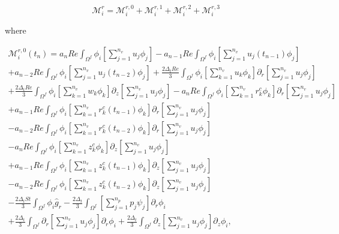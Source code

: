 \documentclass{article}
\begin{document}
\begin{equation}
\mathcal{M}_i^r = \mathcal{M}_i^{r,0} + \mathcal{M}_i^{r,1} + \mathcal{M}_i^{r,2} + \mathcal{M}_i^{r,3} \tag{4.81}
\end{equation}

where

\begin{equation}
\begin{array}{l} \mathcal{M}_i^{r,0}(t_n) = a_n Re \int_{\Omega^f} \phi_i \left[ \sum_{j=1}^{n_v} u_j \phi_j \right] - a_{n-1} Re \int_{\Omega^f} \phi_i \left[ \sum_{j=1}^{n_v} u_j(t_{n-1}) \phi_j \right] \\ + a_{n-2} Re \int_{\Omega^f} \phi_i \left[ \sum_{j=1}^{n_v} u_j(t_{n-2}) \phi_j \right] + \frac{2\Delta_t Re}{3} \int_{\Omega^f} \phi_i \left[ \sum_{k=1}^{n_v} u_k \phi_k \right] \partial_r \left[ \sum_{j=1}^{n_v} u_j \phi_j \right] \\ + \frac{2\Delta_t Re}{3} \int_{\Omega^f} \phi_i \left[ \sum_{k=1}^{n_v} w_k \phi_k \right] \partial_z \left[ \sum_{j=1}^{n_v} u_j \phi_j \right] - a_n Re \int_{\Omega^f} \phi_i \left[ \sum_{k=1}^{n_v} r_k^c \phi_k \right] \partial_r \left[ \sum_{j=1}^{n_v} u_j \phi_j \right] \\ + a_{n-1} Re \int_{\Omega^f} \phi_i \left[ \sum_{k=1}^{n_v} r_k^c(t_{n-1}) \phi_k \right] \partial_r \left[ \sum_{j=1}^{n_v} u_j \phi_j \right] \\ - a_{n-2} Re \int_{\Omega^f} \phi_i \left[ \sum_{k=1}^{n_v} r_k^c(t_{n-2}) \phi_k \right] \partial_r \left[ \sum_{j=1}^{n_v} u_j \phi_j \right] \\ - a_n Re \int_{\Omega^f} \phi_i \left[ \sum_{k=1}^{n_v} z_k^c \phi_k \right] \partial_z \left[ \sum_{j=1}^{n_v} u_j \phi_j \right] \\ + a_{n-1} Re \int_{\Omega^f} \phi_i \left[ \sum_{k=1}^{n_v} z_k^c(t_{n-1}) \phi_k \right] \partial_z \left[ \sum_{j=1}^{n_v} u_j \phi_j \right] \\ - a_{n-2} Re \int_{\Omega^f} \phi_i \left[ \sum_{k=1}^{n_v} z_k^c(t_{n-2}) \phi_k \right] \partial_z \left[ \sum_{j=1}^{n_v} u_j \phi_j \right] \\ - \frac{2\Delta_t St}{3} \int_{\Omega^f} \phi_i \hat{g}_r - \frac{2\Delta_t}{3} \int_{\Omega^f} \left[ \sum_{j=1}^{n_p} p_j \psi_j \right] \partial_r \phi_i \\ + \frac{2\Delta_t}{3} \int_{\Omega^f} \partial_r \left[ \sum_{j=1}^{n_v} u_j \phi_j \right] \partial_r \phi_i + \frac{2\Delta_t}{3} \int_{\Omega^f} \partial_z \left[ \sum_{j=1}^{n_v} u_j \phi_j \right] \partial_z \phi_i, \end{array} \tag{4.82}
\end{equation}
\end{document}
